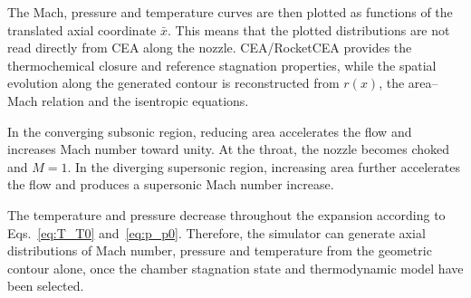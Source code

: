 The Mach, pressure and temperature curves are then plotted as functions of the translated axial coordinate \(\bar{x}\). This means that the plotted distributions are not read directly from CEA along the nozzle. CEA/RocketCEA provides the thermochemical closure and reference stagnation properties, while the spatial evolution along the generated contour is reconstructed from \(r(x)\), the area--Mach relation and the isentropic equations.

In the converging subsonic region, reducing area accelerates the flow and increases Mach number toward unity. At the throat, the nozzle becomes choked and $M=1$. In the diverging supersonic region, increasing area further accelerates the flow and produces a supersonic Mach number increase.

The temperature and pressure decrease throughout the expansion according to Eqs.~\eqref{eq:T_T0} and~\eqref{eq:p_p0}. Therefore, the simulator can generate axial distributions of Mach number, pressure and temperature from the geometric contour alone, once the chamber stagnation state and thermodynamic model have been selected.

